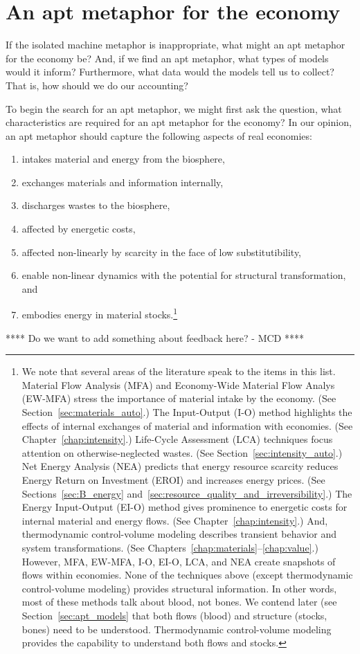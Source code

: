 \section{An apt metaphor for the economy}
\label{sec:apt_metaphor}

If the isolated machine metaphor is inappropriate, 
what might an apt metaphor for the economy be?
And, if we find an apt metaphor, what types of models would it inform?
Furthermore, what data would the models tell us to collect?
That is, how should we do our accounting?

To begin the search for an apt metaphor, 
we might first ask the question, 
what characteristics are required for an apt metaphor for the economy?
In our opinion, an apt metaphor should capture the following
aspects of real economies:

\begin{enumerate}
	\item{intakes material and energy from the biosphere,}
	\item{exchanges materials and information internally,}
	\item{discharges wastes to the biosphere,}
	\item{affected by energetic costs,}
	\item{affected non-linearly by scarcity in the face of low substitutibility,}
	\item{enable non-linear dynamics with the potential for structural transformation, and}
	\item{embodies energy in material stocks.\footnote{We note that 
	several areas of the literature speak to the items in this list.
	Material Flow Analysis (MFA) and 
	Economy-Wide Material Flow Analys (EW-MFA)
	stress the importance of
	material intake by the economy. 
	(See Section~\ref{sec:materials_auto}.)
	The Input-Output (I-O) method highlights the effects of internal exchanges
	of material and information with economies. 
	(See Chapter~\ref{chap:intensity}.)
	Life-Cycle Assessment (LCA) techniques focus attention 
	on otherwise-neglected wastes. 
	(See Section~\ref{sec:intensity_auto}.)
	Net Energy Analysis (NEA) predicts that energy resource 
	scarcity reduces Energy Return on Investment (EROI)
	and increases energy prices.
	(See Sections~\ref{sec:B_energy} and~\ref{sec:resource_quality_and_irreversibility}.)
	The Energy Input-Output (EI-O) method gives prominence to energetic costs
	for internal material and energy flows.
	(See Chapter~\ref{chap:intensity}.)
	And, thermodynamic control-volume modeling describes
	transient behavior and system transformations.
	(See Chapters~\ref{chap:materials}--\ref{chap:value}.)
	However, MFA, EW-MFA, I-O, EI-O, LCA, and NEA create snapshots of flows within economies. 
	None of the techniques above (except thermodynamic control-volume modeling) 
	provides structural information. 
	In other words, most of these methods talk about blood, not bones. 
	We contend later (see Section~\ref{sec:apt_models} that both flows (blood) 
	and structure (stocks, bones) need to be understood.
	Thermodynamic control-volume modeling provides the capability 
	to understand both flows and stocks.}}
\end{enumerate}
**** Do we want to add something about feedback here? - MCD ****

